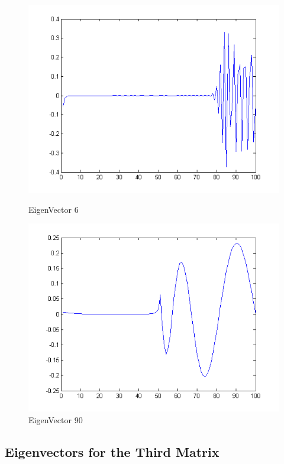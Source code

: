 \documentclass[12pt]{article}
\begin{document}
\begin{figure}[H]
\begin{minipage}[b]{0.5\linewidth}
\includegraphics[scale=.5]{v2p6.png}
\caption{EigenVector 6}
\end{minipage}
\begin{minipage}[b]{0.5\linewidth}
\includegraphics[scale=.5]{v2p90.png}
\caption{EigenVector 90}
\end{minipage}
\end{figure}

\subsection*{Eigenvectors for the Third Matrix}
\end{document}
